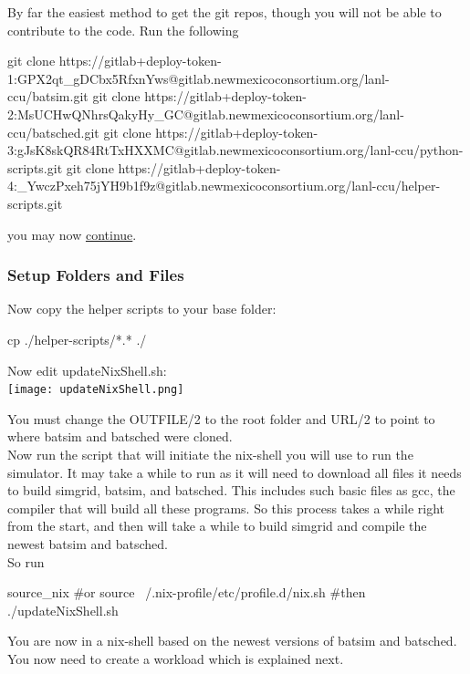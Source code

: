 \documentclass[titlepage]{article}
\makeatletter
\renewcommand\paragraph{\@startsection{paragraph}{4}{\z@}{-3.25ex \@plus1ex \@minus.2ex}{10pt}{\sffamily\normalsize\bfseries}}
\makeatother
\begin{document}
\paragraph{Option 4: Use deploy token}
By far the easiest method to get the git repos, though you will not be able to contribute to the code.  Run the following
\begin{terminal}
git clone https://gitlab+deploy-token-1:GPX2qt_gDCbx5RfxnYws@gitlab.newmexicoconsortium.org/lanl-ccu/batsim.git
git clone https://gitlab+deploy-token-2:MsUCHwQNhrsQakyHy_GC@gitlab.newmexicoconsortium.org/lanl-ccu/batsched.git
git clone https://gitlab+deploy-token-3:gJsK8skQR84RtTxHXXMC@gitlab.newmexicoconsortium.org/lanl-ccu/python-scripts.git
git clone https://gitlab+deploy-token-4:_YwczPxeh75jYH9b1f9z@gitlab.newmexicoconsortium.org/lanl-ccu/helper-scripts.git
\end{terminal}
you may now \hyperlink{continue_on}{continue}.

\hypertarget{continue_on}{}
\subsubsection{Setup Folders and Files}
Now copy the helper scripts to your base folder:
\begin{terminal}
cp ./helper-scripts/*.* ./
\end{terminal}

Now edit updateNixShell.sh:\\

\texttt{[image: updateNixShell.png]}

You must change the OUTFILE/2 to the root folder and URL/2 to point to where batsim and batsched were cloned.\\

Now run the script that will initiate the nix-shell you will use to run the simulator.  It may take a while to run as it will need to
download all files it needs to build simgrid, batsim, and batsched.  This includes such basic files as gcc, the compiler that will build all these programs.
So this process takes a while right from the start, and then will take a while to build simgrid and compile the newest batsim and batsched.\\

So run
\begin{terminal}
source_nix
#or
source ~/.nix-profile/etc/profile.d/nix.sh
#then
./updateNixShell.sh
\end{terminal}


You are now in a nix-shell based on the newest versions of batsim and batsched.  You now need to create a workload which is explained next.
\hypertarget{create_workload}{}
\end{document}
